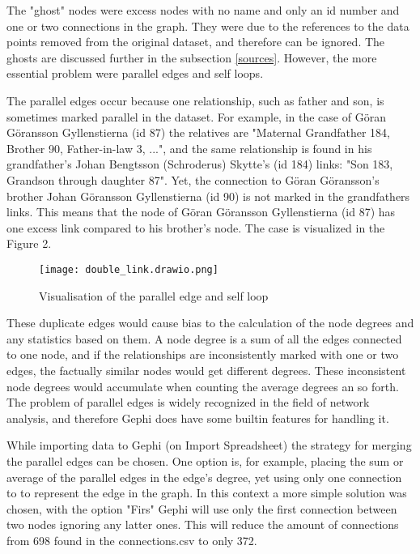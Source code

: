 The "ghost" nodes were excess nodes with no name and only an id number and one or two connections in the graph. They were due to the references to the data points removed from the original dataset, and therefore can be ignored. The ghosts are discussed further in the subsection \ref{sources}. However, the more essential problem were parallel edges and self loops.

The parallel edges occur because one relationship, such as father and son, is sometimes marked parallel in the dataset. For example, in the case of Göran Göransson Gyllenstierna (id 87) the relatives are "Maternal Grandfather 184, Brother 90, Father-in-law 3, ...", and the same relationship is found in his grandfather's Johan Bengtsson (Schroderus) Skytte's (id 184) links: "Son 183, Grandson through daughter 87". Yet, the connection to Göran Göransson's brother Johan Göransson Gyllenstierna (id 90) is not marked in the grandfathers links. This means that the node of Göran Göransson Gyllenstierna (id 87) has one excess link compared to his brother's node. The case is visualized in the Figure 2.

\begin{figure}[h]
	\texttt{[image: double\_link.drawio.png]}
	\centering
	\caption{Visualisation of the parallel edge and self loop} 
	\centering
\end{figure}

These duplicate edges would cause bias to the calculation of the node degrees and any statistics based on them. A node degree is a sum of all the edges connected to one node, and if the relationships are inconsistently marked with one or two edges, the factually similar nodes would get different degrees. These inconsistent node degrees would accumulate when counting the average degrees an so forth. The problem of parallel edges is widely recognized in the field of network analysis, and therefore Gephi does have some builtin features for handling it.

While importing data to Gephi (on Import Spreadsheet) the strategy for merging the parallel edges can be chosen. One option is, for example, placing the sum or average of the parallel edges in the edge's degree, yet using only one connection to to represent the edge in the graph. In this context a more simple solution was chosen, with the option "Firs" Gephi will use only the first connection between two nodes ignoring any latter ones. This will reduce the amount of connections from 698 found in the connections.csv to only 372.

